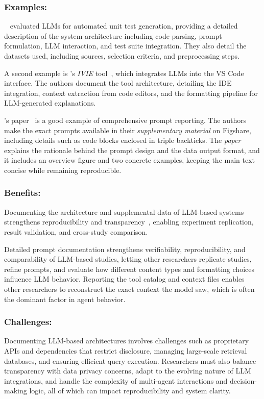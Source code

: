 \documentclass[smallextended]{svjour3}
\newcommand{\paper}{\emph{paper}\xspace}
\newcommand{\supplementarymaterial}{\emph{supplementary material}\xspace}
\newcommand{\paper}{\emph{paper}\xspace}
\newcommand{\supplementarymaterial}{\emph{supplementary material}\xspace}
\newcommand{\guidelinesubsubsection}[1]{\subsubsection{\bfseries #1:}}
\newcommand{\guidelinesubsubsection}[1]{\subsubsection{#1}}
\begin{document}
\guidelinesubsubsection{Examples}

\citeauthor{DBLP:journals/tse/SchaferNET24}~\cite{DBLP:journals/tse/SchaferNET24} evaluated LLMs for automated unit test generation, providing a detailed description of the system architecture including code parsing, prompt formulation, LLM interaction, and test suite integration.
They also detail the datasets used, including sources, selection criteria, and preprocessing steps.

A second example is \citeauthor{DBLP:conf/chi/YanHWH24}'s \emph{IVIE} tool~\cite{DBLP:conf/chi/YanHWH24}, which integrates LLMs into the VS Code interface.
The authors document the tool architecture, detailing the IDE integration, context extraction from code editors, and the formatting pipeline for LLM-generated explanations.

\citeauthor{DBLP:journals/pacmse/LiangBBDFF024}'s paper~\cite{DBLP:journals/pacmse/LiangBBDFF024} is a good example of comprehensive prompt reporting.
The authors make the exact prompts available in their \supplementarymaterial on Figshare, including details such as code blocks enclosed in triple backticks.
The \paper explains the rationale behind the prompt design and the data output format, and it includes an overview figure and two concrete examples, keeping the main text concise while remaining reproducible.

\guidelinesubsubsection{Benefits}

Documenting the architecture and supplemental data of LLM-based systems strengthens reproducibility and transparency~\cite{DBLP:journals/software/LuZXXW24}, enabling experiment replication, result validation, and cross-study comparison.

Detailed prompt documentation strengthens verifiability, reproducibility, and comparability of LLM-based studies, letting other researchers replicate studies, refine prompts, and evaluate how different content types and formatting choices influence LLM behavior.
Reporting the tool catalog and context files enables other researchers to reconstruct the exact context the model saw, which is often the dominant factor in agent behavior.

\guidelinesubsubsection{Challenges}

Documenting LLM-based architectures involves challenges such as proprietary APIs and dependencies that restrict disclosure, managing large-scale retrieval databases, and ensuring efficient query execution.
Researchers must also balance transparency with data privacy concerns, adapt to the evolving nature of LLM integrations, and handle the complexity of multi-agent interactions and decision-making logic, all of which can impact reproducibility and system clarity.
\end{document}
